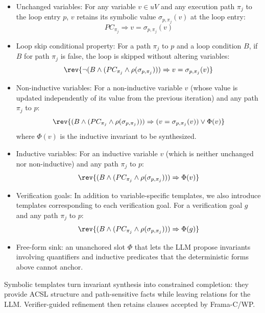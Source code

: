 \begin{itemize}
    \item Unchanged variables:
For any variable $v \in uV$ and any execution path $\pi_j$ to the loop entry $p$, $v$ retains its symbolic value $\sigma_{p, \pi_j}(v)$ at the loop entry:
\[ PC_{\pi_j} \Rightarrow v = \sigma_{p, \pi_j}(v) \]


\item Loop skip conditional property: 
For a path $\pi_j$ to $p$ and a loop condition $B$, if $B$ for path $\pi_j$ is false, the loop is skipped without altering variables:
\[\rev{\neg (B \land (PC_{\pi_j} \land \rho(\sigma_{p, \pi_j}))) \Rightarrow v = \sigma_{p, \pi_j}(v)}\]



\item Non-inductive variables: 
For a non-inductive variable $v$ (whose value is updated independently of its value from the previous iteration) and any path $\pi_j$ to $p$:
\[\rev{(B \land (PC_{\pi_j} \land \rho(\sigma_{p, \pi_j}))) \Rightarrow (v = \sigma_{p, \pi_j}(v)) \lor \Phi(v)}\]
where $\Phi(v)$ is the inductive invariant to be synthesized.


\item Inductive variables: 
For an inductive variable $v$ (which is neither unchanged nor non-inductive) and any path $\pi_j$ to $p$:
\[ \rev{(B \land (PC_{\pi_j} \land \rho(\sigma_{p, \pi_j}))) \Rightarrow \Phi(v)} \]

\item Verification goals:
In addition to variable-specific templates, we also introduce templates corresponding to each verification goal.
For a verification goal $g$ and any path $\pi_j$ to $p$:
\[ \rev{(B \land (PC_{\pi_j} \land \rho(\sigma_{p, \pi_j}))) \Rightarrow \Phi(g)}
\]

\item Free-form sink: an unanchored slot $\Phi$ that lets the LLM propose invariants involving quantifiers and inductive predicates that the deterministic forms above cannot anchor.

\end{itemize}









Symbolic templates turn invariant synthesis into constrained completion: they provide ACSL structure and path-sensitive facts while leaving relations for the LLM. Verifier-guided refinement then retains clauses accepted by Frama-C/WP.
